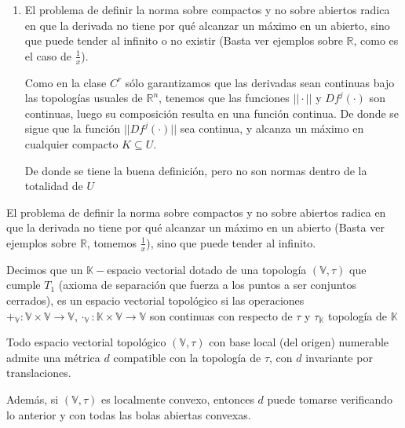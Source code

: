 \begin{rmrk}
\begin{enumerate}
		De donde resulta la equivalencia:
		
		\begin{equation*}
			||f||_{r,K} \leq ||f||_{S,r,K} \leq  (r+1) \cdot ||f||_{r,K}
		\end{equation*}
		
		Luego ambas definen la misma topología.
		
		\item El problema de definir la norma sobre compactos y no sobre abiertos radica en que la derivada no tiene por qué alcanzar un máximo en un abierto, sino que puede tender al infinito o no existir (Basta ver ejemplos sobre $\mathbb{R}$, como es el caso de $\frac{1}{x}$).
		
		Como en la clase $C^r$  sólo garantizamos que las derivadas sean continuas bajo las topologías usuales de $\mathbb{R}^n$, tenemos que las funciones $||\cdot||$  y $Df^j(\cdot)$ son continuas, luego su composición resulta en una función continua. De donde se sigue que la función $||Df^j(\cdot)||$ sea continua, y alcanza un máximo en cualquier compacto $K\subseteq U$. 
		
		De donde se tiene la buena definición, pero no son normas dentro de la totalidad de $U$
	\end{enumerate}
\end{rmrk}

\begin{rmrk}
	El problema de definir la norma sobre compactos y no sobre abiertos radica en que la derivada no tiene por qué alcanzar un máximo en un abierto (Basta ver ejemplos sobre $\mathbb{R}$, tomemos $\frac{1}{x}$), sino que puede tender al infinito. 
	
	
	
\end{rmrk}


\begin{defn}
	Decimos que un $\mathbb{K}-$espacio vectorial dotado de una topología $(\mathbb{V}, \tau)$ que cumple $T_1$ (axioma de separación que fuerza a los puntos a ser conjuntos cerrados), es un espacio vectorial topológico si las operaciones $+_{\mathbb{V}}:\mathbb{V}\times\mathbb{V} \to \mathbb{V} ,\cdot_{\mathbb{V}}: \mathbb{K} \times \mathbb{V} \to \mathbb{V}$ son continuas con respecto de $\tau$ y $\tau_{\mathbb{K}}$ topología de $\mathbb{K}$
\end{defn}


\begin{thm}
	Todo espacio vectorial topológico $(\mathbb{V},\tau)$ con base local (del origen) numerable admite una métrica $d$ compatible con la topología de $\tau$, con $d$ invariante por translaciones.
	
	Además, si $(\mathbb{V},\tau)$ es localmente convexo, entonces $d$ puede tomarse verificando lo anterior y con todas las bolas abiertas convexas.
\end{thm}

